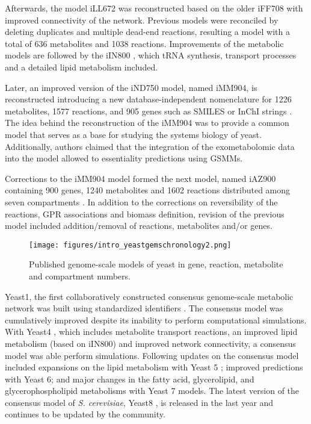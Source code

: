 Afterwards, the model iLL672 was reconstructed based on the older iFF708 with improved connectivity of the network\cite{kuepfer2005metabolic}. Previous models were reconciled by deleting duplicates and multiple dead-end reactions, resulting a model with a total of 636 metabolites and 1038 reactions. Improvements of the metabolic models are followed by the iIN800 \cite{nookaew2008genome}, which tRNA synthesis, transport processes and a detailed lipid metabolism included.

Later, an improved version of the iND750 model, named iMM904, is reconstructed introducing a new database-independent nomenclature for 1226 metabolites, 1577 reactions, and 905 genes such as SMILES or InChI strings \cite{mo2009connecting}. The idea behind the reconstruction of the iMM904 was to provide a common model that serves as a base for studying the systems biology of yeast. Additionally, authors claimed that the  integration of the exometabolomic data into the model allowed to essentiality predictions using GSMMs.

Corrections to the iMM904 model formed the next model, named iAZ900 containing 900 genes, 1240 metabolites and 1602 reactions distributed among seven compartments \cite{zomorrodi2010improving}. In addition to the corrections on reversibility of the reactions, GPR associations and biomass definition, revision of the previous model included addition/removal of reactions, metabolites and/or genes.

\begin{figure}[H]
\texttt{[image: figures/intro\_yeastgemschronology2.png]}
\caption[Published genome-scale models of yeast in gene, reaction, metabolite and compartment numbers]{Published genome-scale models of yeast in gene, reaction, metabolite and compartment numbers.}
\label{fig:intro_yeastgemschronology2}
\end{figure}

Yeast1, the first collaboratively constructed consensus genome-scale metabolic network was built using standardized identifiers \cite{herrgaard2008consensus}. The consensus model was cumulatively improved despite its inability to perform computational simulations. With Yeast4 \cite{dobson2010further}, which includes metabolite transport reactions, an improved lipid metabolism (based on iIN800) and improved network connectivity, a consensus model was able perform simulations. Following updates on the consensus model included expansions on the lipid metabolism with Yeast 5 \cite{heavner2012yeast}; improved predictions with Yeast 6\cite{heavner2013version}; and major changes in the fatty acid, glycerolipid, and glycerophospholipid metabolisms with Yeast 7 \cite{aung2013revising} models. The latest version of the consensus model of \emph{S. cerevisiae}, Yeast8 \cite{lu2019consensus}, is released in the last year and continues to be updated by the community.



